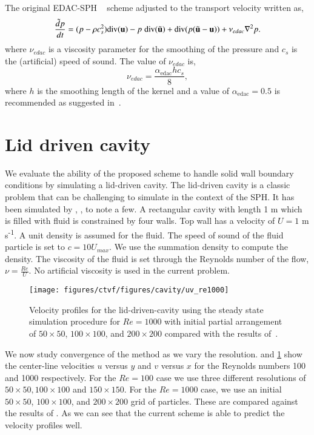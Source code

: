 The original EDAC-SPH ~\citep{edac-sph:cf:2019} scheme adjusted to
the transport velocity written as,
\begin{equation}
  \label{eq:edac-p-evolve}
  \frac{\tilde{d} p}{d t} =
  (p -\rho c_s^2)
    \text{div}(\mathbf{u})
  - p \; \text{div}(\tilde{\mathbf{u}})
    + \text{div}(p (\tilde{\mathbf{u}} - \mathbf{u}))
    + \nu_{edac}  \nabla^2 p.
\end{equation}
where $\nu_{edac}$ is a viscosity parameter for the smoothing of the pressure
and $c_s$ is the (artificial) speed of sound.
%
The value of $\nu_{edac}$ is,
\begin{equation}
  \label{eq:nu-edac}
  \nu_{edac} = \frac{\alpha_{\textrm{edac}} h c_s}{8},
\end{equation}
where $h$ is the smoothing length of the kernel and a value of
$\alpha_{\textrm{edac}}=0.5$ is recommended as suggested in~\citep{PRKP:edac-sph-iccm2015}.


\FloatBarrier%
\section{Lid driven cavity}
\label{sec:ldc}

We evaluate the ability of the proposed scheme to handle solid wall boundary
conditions by simulating a lid-driven cavity. The lid-driven cavity is a
classic problem that can be challenging to simulate in the context of the SPH.
It has been simulated by \citep{Adami2013}, \citep{huang_kernel_2019},
\citep{edac-sph:cf:2019} to note a few. A rectangular cavity with length 1 m
which is filled with fluid is constrained by four walls. Top wall has a
velocity of $U = 1 $ m\,s\textsuperscript{-1}. A unit density is assumed for the
fluid. The speed of sound of the fluid particle is set to $c = 10 U_{max}$. We
use the summation density to compute the density. The viscosity of the fluid
is set through the Reynolds number of the flow, $\nu = \frac{Re}{U}$. No
artificial viscosity is used in the current problem.
\begin{figure}
  \centering
  \texttt{[image: figures/ctvf/figures/cavity/uv\_re1000]}
  \caption{Velocity profiles for the lid-driven-cavity using the steady state
    simulation procedure for $Re = 1000$ with initial partial arrangement of
    $50 \times 50$, $100 \times 100$, and $200 \times 200$ compared with
    the results of~\citep{ldc:ghia-1982}.}%
\label{fig:ldc:uv_re1000}
\end{figure}

We now study convergence of the method as we vary the
resolution.  and \cref{fig:ldc:uv_re1000} show the
center-line velocities $u$ versus $y$ and $v$ versus $x$ for the Reynolds
numbers 100 and 1000 respectively. For the $Re=100$ case we use three
different resolutions of $50\times 50, 100 \times 100$ and $150 \times
150$. For the $Re=1000$ case, we use an initial $50 \times 50$,
$100 \times 100$, and $200 \times 200$ grid of particles. These are compared
against the results of \citep{ldc:ghia-1982}. As we can see that the current
scheme is able to predict the velocity profiles well.


